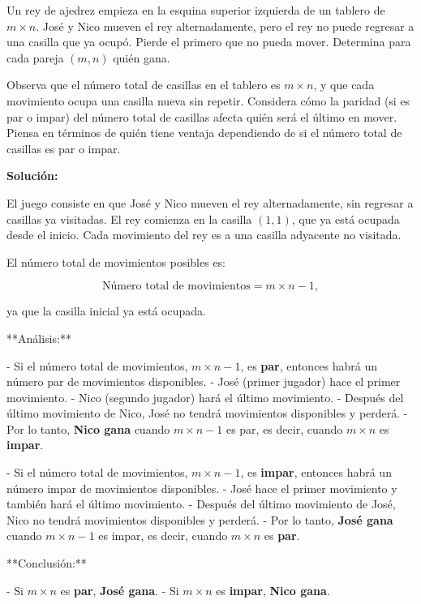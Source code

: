 \documentclass[11pt]{scrartcl}
\begin{document}
\begin{problem}
Un rey de ajedrez empieza en la esquina superior izquierda de un tablero de $m \times n$. José y Nico mueven el rey alternadamente, pero el rey no puede regresar a una casilla que ya ocupó. Pierde el primero que no pueda mover. Determina para cada pareja $(m, n)$ quién gana.

\begin{hint}
Observa que el número total de casillas en el tablero es $m \times n$, y que cada movimiento ocupa una casilla nueva sin repetir. Considera cómo la paridad (si es par o impar) del número total de casillas afecta quién será el último en mover. Piensa en términos de quién tiene ventaja dependiendo de si el número total de casillas es par o impar.

\begin{solu}
\textbf{Solución:}

El juego consiste en que José y Nico mueven el rey alternadamente, sin regresar a casillas ya visitadas. El rey comienza en la casilla $(1,1)$, que ya está ocupada desde el inicio. Cada movimiento del rey es a una casilla adyacente no visitada. 

El número total de movimientos posibles es:

$$
\text{Número total de movimientos} = m \times n - 1,
$$

ya que la casilla inicial ya está ocupada.

**Análisis:**

- Si el número total de movimientos, $m \times n - 1$, es \textbf{par}, entonces habrá un número par de movimientos disponibles.
  - José (primer jugador) hace el primer movimiento.
  - Nico (segundo jugador) hará el último movimiento.
  - Después del último movimiento de Nico, José no tendrá movimientos disponibles y perderá.
  - Por lo tanto, \textbf{Nico gana} cuando $m \times n - 1$ es par, es decir, cuando $m \times n$ es \textbf{impar}.

- Si el número total de movimientos, $m \times n - 1$, es \textbf{impar}, entonces habrá un número impar de movimientos disponibles.
  - José hace el primer movimiento y también hará el último movimiento.
  - Después del último movimiento de José, Nico no tendrá movimientos disponibles y perderá.
  - Por lo tanto, \textbf{José gana} cuando $m \times n - 1$ es impar, es decir, cuando $m \times n$ es \textbf{par}.

**Conclusión:**

- Si $m \times n$ es \textbf{par}, \textbf{José gana}.
- Si $m \times n$ es \textbf{impar}, \textbf{Nico gana}.


\end{solu}
\end{hint}
\end{problem}
\end{document}
